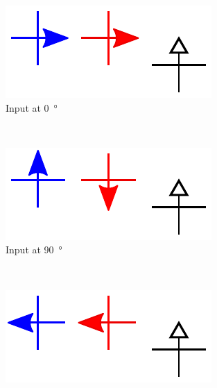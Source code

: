 \documentclass[11pt,a4paper,english]{article}
\newcommand{\rulesep}{\unskip\ \vrule\ }
\begin{document}
\begin{figure}
    \centering
    \begin{subfigure}[t]{0.23\textwidth}
        \includegraphics[width=\textwidth]{Figures/half_adder/schematic/000006side_inputs_In1_0312/Input 0 deg.pdf}
        \caption{Input at \SI{0}{\degree}}
    \end{subfigure}
    \rulesep
    \begin{subfigure}[t]{0.23\textwidth}
        \includegraphics[width=\textwidth]{Figures/half_adder/schematic/000006side_inputs_In1_0312/Input 90 deg.pdf}
        \caption{Input at \SI{90}{\degree}}
    \end{subfigure}
    \rulesep
    \begin{subfigure}[t]{0.23\textwidth}
        \includegraphics[width=\textwidth]{Figures/half_adder/schematic/000006side_inputs_In1_0312/Input 180 deg.pdf}

\end{subfigure}
\end{figure}
\end{document}
